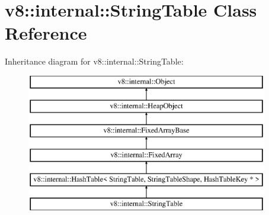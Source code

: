 \hypertarget{classv8_1_1internal_1_1_string_table}{}\section{v8\+:\+:internal\+:\+:String\+Table Class Reference}
\label{classv8_1_1internal_1_1_string_table}
Inheritance diagram for v8\+:\+:internal\+:\+:String\+Table\+:\begin{figure}[H]
\begin{center}
\leavevmode
\includegraphics[height=6.000000cm]{classv8_1_1internal_1_1_string_table}
\end{center}
\end{figure}
